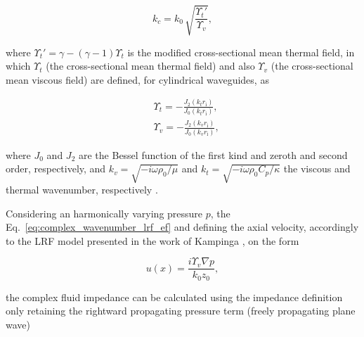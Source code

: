\documentclass[12pt]{article}
\newcommand{\diff}{\mathrm{d}\mkern1mu} %
\begin{document}
\begin{equation} \label{eq:complex_wavenumber_lrf_ef}
	k_c= k_0 \, \sqrt{\frac{\Upsilon_t'}{\Upsilon_v} }, 
\end{equation}

\noindent where $\Upsilon_t'=\gamma - (\gamma - 1) \Upsilon_t$ is the modified cross-sectional mean thermal field, in which $\Upsilon_t$ (the cross-sectional mean thermal field) and also $\Upsilon_v$ (the cross-sectional mean viscous field) are defined, for cylindrical waveguides, as


\begin{align}
	& \Upsilon_t =  -\frac{J_2(k_t r_\text{i})}{J_0(k_t r_\text{i})}, \\
	& \Upsilon_v = -\frac{J_2(k_v r_\text{i})}{J_0(k_v r_\text{i})},
\end{align}

\noindent where $J_0$ and  $J_2$ are the Bessel function of the first kind and zeroth and second order, respectively, and $k_v = \sqrt{ -i \omega \rho_0 / \mu } $ and $k_t = \sqrt{ - i \omega \rho_0 C_p / \kappa}$ the viscous and thermal wavenumber, respectively \cite{kampinga_phdthesis}.

\noindent Considering an harmonically varying pressure $p$, the Eq.~\ref{eq:complex_wavenumber_lrf_ef} and defining the axial velocity, accordingly to the \acrshort{LRF} model presented in the work of Kampinga \cite[Eq.~3.46a in][]{kampinga_phdthesis}, on the form

\begin{equation} \label{eq:velocity_lrf}
	u(x) = \frac{i \Upsilon_v \nabla p}{k_0 z_0}, 
\end{equation}

\noindent the complex fluid impedance can be calculated using the impedance definition only retaining the rightward propagating pressure term (freely propagating plane wave)
\end{document}
